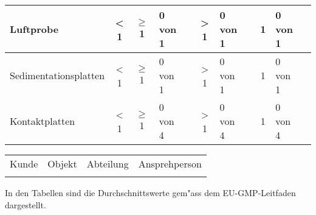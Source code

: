 \begin{tabularx}{\textwidth}{|l|c|c|X|c|c|X|c|c|X|c|}
	
	\hline
	Luftprobe & 
	< 1  & $\geq$ 1 & 0 von 1 & \CheckBox[print,width=0.6em,height=0.6em,checked,name=ch10]{}& > 1  & 0 von 1 &  \CheckBox[width=0.6em,height=0.6em,checked,name=ch11]{}&
	1 & 0 von 1 &  \CheckBox[print,width=0.6em,height=0.6em,checked,name=ch12]{} \\
	\hline
	Sedimentationsplatten & 
	< 1  & $\geq$ 1 & 0 von 1 & \CheckBox[print,width=0.6em,height=0.6em,checked,name=ch13]{}& > 1  & 0 von 1 &  \CheckBox[width=0.6em,height=0.6em,checked,name=ch14]{}&
	1 & 0 von 1 &  \CheckBox[width=0.6em,height=0.6em,checked,name=ch15]{} \\
	\hline
	Kontaktplatten & 
	< 1  & $\geq$ 1 & 0 von 4 & \CheckBox[print,width=0.6em,height=0.6em,checked,name=ch16]{}& > 1  & 0 von 4 &  \CheckBox[width=0.6em,height=0.6em,checked,name=ch17]{}&
	1 & 0 von 4 &  \CheckBox[print,width=0.6em,height=0.6em,checked,name=ch18]{} \\
	\hline
\end{tabularx}

\newpage
\begin{tabularx}{\textwidth}{XXXX}
	Kunde & Objekt & Abteilung & Ansprehperson \tabularnewline
	\kundeline& \objekt& \abteilung & \ansprechtsperson \tabularnewline
\end{tabularx}
\par
In den Tabellen sind die Durchschnittswerte gem"ass dem EU-GMP-Leitfaden dargestellt.
\par 
\vspace{1ex}
\raum \qquad \kklasse \qquad \betriebszustand

